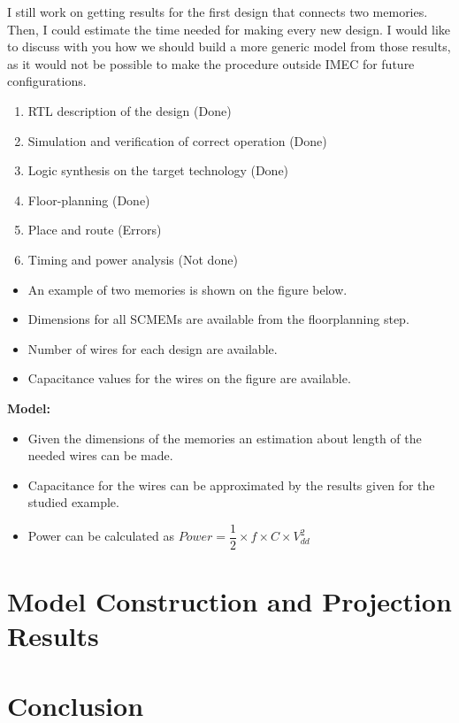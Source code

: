 \documentclass[12pt,a4paper]{article}
\begin{document}
I still work on getting results for the first design that connects two memories. Then, I could estimate the time needed for making every new design. I would like to discuss with you how we should build a more generic model from those results, as it would not be possible to make the procedure outside IMEC for future configurations.

\begin{enumerate}
\item RTL description of the design (Done)
\item Simulation and verification of correct operation (Done)
\item Logic synthesis on the target technology (Done)
\item Floor-planning (Done)
\item Place and route (Errors) 
\item Timing and power analysis (Not done)
\end{enumerate}

\begin{itemize}
\item An example of two memories is shown on the figure below.
\item Dimensions for all SCMEMs are available from the floorplanning step.
\item Number of wires for each design are available.
\item Capacitance values for the wires on the figure are available. 
\end{itemize}

 
\textbf{Model:}

\begin{itemize}
\item Given the dimensions of the memories an estimation about length of the needed wires can be made.
\item Capacitance for the wires can be approximated by the results given for the studied example.
\item Power can be calculated as $Power = \dfrac{1}{2} \times f \times C \times V_{dd}^{2} $
\end{itemize}


\section{Model Construction and Projection Results}


\section{Conclusion}
\end{document}
